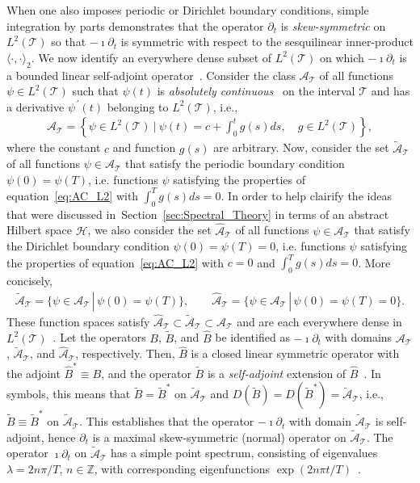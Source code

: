 \documentclass[leqno,onefignum,onetabnum]{siamltex1213}
\newcommand{\secref}[1]{Section~\ref{#1}}
\newcommand{\Tc}{\mathcal{T}}
\newcommand{\Hs}{\mathscr{H}}
\newcommand{\As}{\mathscr{A}}
\begin{document}
When one also imposes periodic or Dirichlet boundary conditions,
simple integration by parts demonstrates that the operator $\partial_t$ is
\emph{skew-symmetric} on $L^2(\Tc)$ so that $-\imath\partial_t$ is symmetric with
respect to the sesquilinear inner-product $\langle\cdot,\cdot\rangle_2$. We now identify an
everywhere dense subset of $L^2(\Tc)$ on which $-\imath\partial_t$ is a bounded
linear self-adjoint operator~\cite{Reed-1980,Stone:64}. Consider the
class $\As_{\Tc}$ of all functions $\psi\in L^2(\Tc)$ such that $\psi(t)$ is
\emph{absolutely continuous}~\cite{Royden:1988:RA} on the interval
$\Tc$ and has a derivative $\psi^{\,\prime}(t)$ belonging to $L^2(\Tc)$,
i.e.,~\cite{Stone:64,Royden:1988:RA}     
%
\begin{align}\label{eq:AC_L2}
  \As_{\Tc}=
     \left\{
       \psi\in L^2(\Tc) \ \Big| \ \psi(t)=c+\int_0^tg(s)ds,
       \quad  g\in L^2(\Tc)
     \right\},
\end{align}
%
where the constant $c$ and function $g(s)$ are
arbitrary. Now, consider the set $\tilde{\As}_{\Tc}$ of all
functions $\psi\in\As_{\Tc}$ that satisfy the periodic boundary condition
$\psi(0)=\psi(T)$, i.e. functions $\psi$ satisfying the properties of 
equation~\eqref{eq:AC_L2} with $\int_0^Tg(s)ds=0$. In order to help
clairify the ideas that were discussed in~\secref{sec:Spectral_Theory}
in terms of an abstract 
Hilbert space $\Hs$, we also consider the set $\hat{\As}_{\Tc}$ of all
functions $\psi\in\As_{\Tc}$ that satisfy the Dirichlet boundary condition
$\psi(0)=\psi(T)=0$, i.e. functions $\psi$ satisfying the properties of
equation~\eqref{eq:AC_L2} with $c=0$ and $\int_0^Tg(s)ds=0$. More
concisely,  
%
\begin{align}\label{eq:AC_BC}
  \tilde{\As}_{\Tc}=\{\psi\in\As_{\Tc} \,|\, \psi(0)=\psi(T)\}, \qquad
  \hat{\As}_{\Tc}=\{\psi\in\As_{\Tc} \,|\, \psi(0)=\psi(T)=0\}.
\end{align}
%
These function spaces satisfy
$\hat{\As}_{\Tc}\subset\tilde{\As}_{\Tc}\subset\As_{\Tc}$ and are each everywhere
dense in $L^2(\Tc)$~\cite{Stone:64}. Let the operators $B$,
$\tilde{B}$, and $\hat{B}$ be identified as $-\imath\partial_t$ with domains
$\As_{\Tc}$, $\tilde{\As}_{\Tc}$, and $\hat{\As}_{\Tc}$,
respectively. Then, $\hat{B}$ is a closed linear symmetric operator
with the adjoint $\hat{B}^*\equiv B$, and the operator $\tilde{B}$ is a
\emph{self-adjoint} extension of $\hat{B}$~\cite{Stone:64}. In
symbols, this means that $\tilde{B}=\tilde{B}^*$ on
$\tilde{\As}_{\Tc}$ and
$D(\tilde{B})=D(\tilde{B}^*)=\tilde{\As}_{\Tc}$,
i.e., $\tilde{B}\equiv\tilde{B}^*$ on $\tilde{\As}_{\Tc}$. This establishes
that the operator $-\imath\partial_t$ with domain $\tilde{\As}_{\Tc}$ is
self-adjoint, hence $\partial_t$ is a maximal skew-symmetric (normal)
operator on $\tilde{\As}_{\Tc}$. The operator $\imath\partial_t$ on
$\tilde{\As}_{\Tc}$ has a simple point spectrum, consisting of
eigenvalues $\lambda=2n\pi/T$, $n\in\mathbb{Z}$, with corresponding
eigenfunctions $\exp(2n\pi t/T)$~\cite{Stone:64}.
\end{document}
